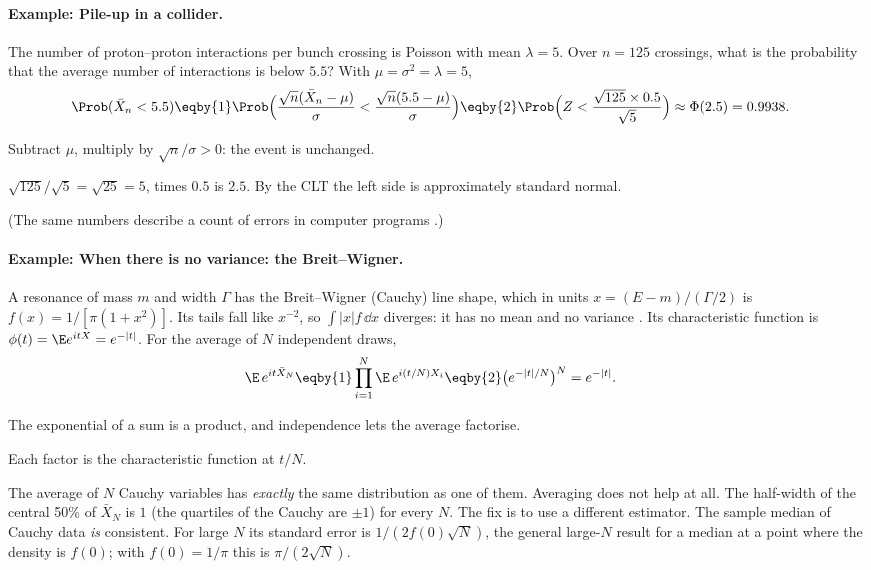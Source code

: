 \paragraph{Example: Pile-up in a collider.}
\label{3a:ex:pileup}
The number of proton--proton interactions per bunch crossing is Poisson with
mean $\lambda=5$. Over $n=125$ crossings, what is the probability that the
average number of interactions is below $5.5$? With $\mu=\sigma^2=\lambda=5$,
\begin{align*}
  \Prob(\bar X_n<5.5)
  &\eqby{1} \Prob\Bigl(\frac{\sqrt n(\bar X_n-\mu)}{\sigma}<\frac{\sqrt n(5.5-\mu)}{\sigma}\Bigr)
   \eqby{2} \Prob\Bigl(Z<\frac{\sqrt{125}\times0.5}{\sqrt5}\Bigr)
   \approx \Phi(2.5)=0.9938 .
\end{align*}
\begin{explain}
  \item Subtract $\mu$, multiply by $\sqrt n/\sigma>0$: the event is unchanged.
  \item $\sqrt{125}/\sqrt5=\sqrt{25}=5$, times $0.5$ is $2.5$. By the CLT
        the left side is approximately standard normal.
\end{explain}
(The same numbers describe a count of errors in computer programs
.)

\paragraph{Example: When there is no variance: the Breit--Wigner.}
\label{3a:ex:cauchy}
A resonance of mass $m$ and width $\Gamma$ has the Breit--Wigner (Cauchy)
line shape, which in units $x=(E-m)/(\Gamma/2)$ is
$f(x)=1/[\pi(1+x^2)]$. Its tails fall like $x^{-2}$, so $\int|x|f\,\dd x$
diverges: it has no mean and no variance . Its
characteristic function is $\phi(t)=\E e^{itX}=e^{-|t|}$. For the average of
$N$ independent draws,
\begin{align*}
  \E\,e^{it\bar X_N}
  &\eqby{1} \prod_{i=1}^N\E\,e^{i(t/N)X_i}
   \eqby{2} \bigl(e^{-|t|/N}\bigr)^N
   = e^{-|t|} .
\end{align*}
\begin{explain}
  \item The exponential of a sum is a product, and independence lets the average factorise.
  \item Each factor is the characteristic function at $t/N$.
\end{explain}
The average of $N$ Cauchy variables has \emph{exactly} the same distribution
as one of them. Averaging does not help at all. The half-width of the
central 50\% of $\bar X_N$ is $1$ (the quartiles of the Cauchy are $\pm1$)
for every $N$. The fix is to use a different estimator. The sample median of
Cauchy data \emph{is} consistent. For large $N$ its standard error is
$1/(2f(0)\sqrt N)$, the general large-$N$ result for a median at a point
where the density is $f(0)$; with $f(0)=1/\pi$ this is $\pi/(2\sqrt N)$.

